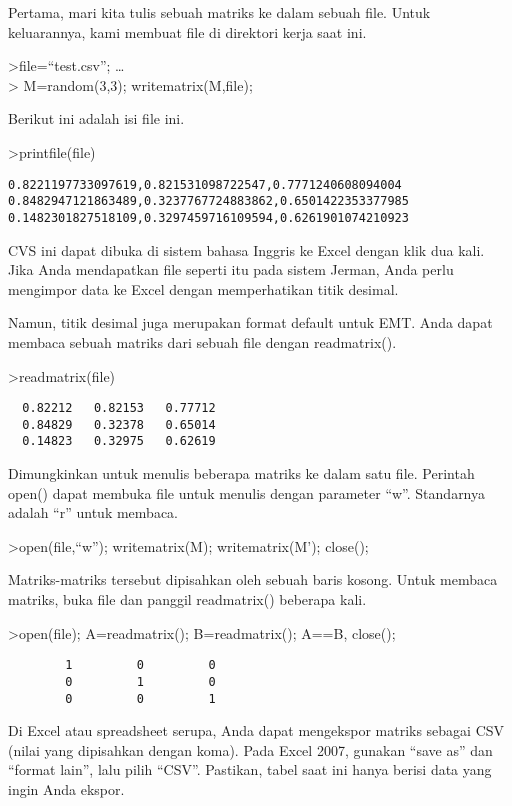 \documentclass[
]{book}
\begin{document}
Pertama, mari kita tulis sebuah matriks ke dalam sebuah file. Untuk keluarannya, kami membuat file di direktori kerja saat ini.

\textgreater file=``test.csv''; \ldots{}\\
\textgreater{} M=random(3,3); writematrix(M,file);

Berikut ini adalah isi file ini.

\textgreater printfile(file)

\begin{verbatim}
0.8221197733097619,0.821531098722547,0.7771240608094004
0.8482947121863489,0.3237767724883862,0.6501422353377985
0.1482301827518109,0.3297459716109594,0.6261901074210923
\end{verbatim}

CVS ini dapat dibuka di sistem bahasa Inggris ke Excel dengan klik dua kali. Jika Anda mendapatkan file seperti itu pada sistem Jerman, Anda perlu mengimpor data ke Excel dengan memperhatikan titik desimal.

Namun, titik desimal juga merupakan format default untuk EMT. Anda dapat membaca sebuah matriks dari sebuah file dengan readmatrix().

\textgreater readmatrix(file)

\begin{verbatim}
  0.82212   0.82153   0.77712 
  0.84829   0.32378   0.65014 
  0.14823   0.32975   0.62619 
\end{verbatim}

Dimungkinkan untuk menulis beberapa matriks ke dalam satu file. Perintah open() dapat membuka file untuk menulis dengan parameter ``w''. Standarnya adalah ``r'' untuk membaca.

\textgreater open(file,``w''); writematrix(M); writematrix(M'); close();

Matriks-matriks tersebut dipisahkan oleh sebuah baris kosong. Untuk membaca matriks, buka file dan panggil readmatrix() beberapa kali.

\textgreater open(file); A=readmatrix(); B=readmatrix(); A==B, close();

\begin{verbatim}
        1         0         0 
        0         1         0 
        0         0         1 
\end{verbatim}

Di Excel atau spreadsheet serupa, Anda dapat mengekspor matriks sebagai CSV (nilai yang dipisahkan dengan koma). Pada Excel 2007, gunakan ``save as'' dan ``format lain'', lalu pilih ``CSV''. Pastikan, tabel saat ini hanya berisi data yang ingin Anda ekspor.
\end{document}
